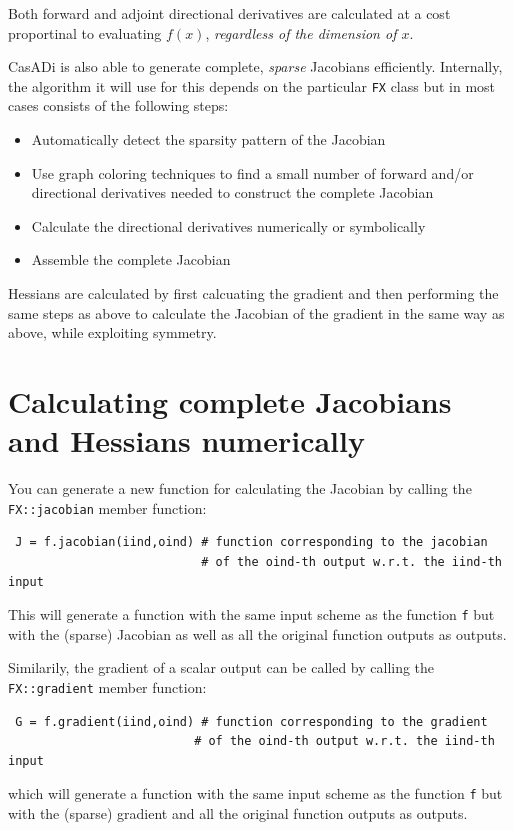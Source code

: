 \documentclass[a4paper,12pt]{book}
\begin{document}
Both forward and adjoint directional derivatives are calculated at a cost proportinal to evaluating $f(x)$, \emph{regardless of the dimension of $x$}.

CasADi is also able to generate complete, \emph{sparse} Jacobians efficiently. Internally, the algorithm it will use for this depends on the particular \texttt{FX} class but in most cases consists of the following steps:
\begin{itemize}
 \item Automatically detect the sparsity pattern of the Jacobian
 \item Use graph coloring techniques to find a small number of forward and/or directional derivatives needed to construct the complete Jacobian
 \item Calculate the directional derivatives numerically or symbolically
 \item Assemble the complete Jacobian
\end{itemize}

Hessians are calculated by first calcuating the gradient and then performing the same steps as above to calculate the Jacobian of the gradient in the same way as above, while exploiting symmetry.


\section{Calculating complete Jacobians and Hessians numerically}
You can generate a new function for calculating the Jacobian by calling the \texttt{FX::jacobian} member function:
\begin{verbatim}
 J = f.jacobian(iind,oind) # function corresponding to the jacobian
                           # of the oind-th output w.r.t. the iind-th input
\end{verbatim}
This will generate a function with the same input scheme as the function \texttt{f} but with the (sparse) Jacobian as well as all the original function outputs as outputs.

Similarily, the gradient of a scalar output can be called by calling the \texttt{FX::gradient} member function:
\begin{verbatim}
 G = f.gradient(iind,oind) # function corresponding to the gradient
                          # of the oind-th output w.r.t. the iind-th input
\end{verbatim}
which will generate a function with the same input scheme as the function \texttt{f} but with the (sparse) gradient and all the original function outputs as outputs.
\end{document}
